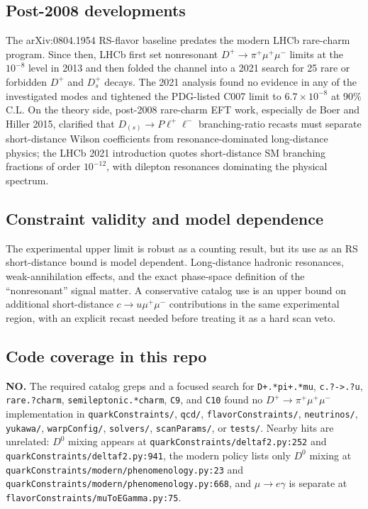 \subsection*{Post-2008 developments}
The arXiv:0804.1954 RS-flavor baseline predates the modern LHCb rare-charm
program.  Since then, LHCb first set nonresonant \(D^+\to\pi^+\mu^+\mu^-\)
limits at the \(10^{-8}\) level in 2013 and then folded the channel into a
2021 search for 25 rare or forbidden \(D^+\) and \(D_s^+\) decays.  The 2021
analysis found no evidence in any of the investigated modes and tightened the
PDG-listed C007 limit to \(6.7\times10^{-8}\) at 90\% C.L.  On the theory side,
post-2008 rare-charm EFT work, especially de Boer and Hiller 2015, clarified
that \(D_{(s)}\to P\ell^+\ell^-\) branching-ratio recasts must separate
short-distance Wilson coefficients from resonance-dominated long-distance
physics; the LHCb 2021 introduction quotes short-distance SM branching
fractions of order \(10^{-12}\), with dilepton resonances dominating the
physical spectrum.

\subsection*{Constraint validity and model dependence}
The experimental upper limit is robust as a counting result, but its use as an
RS short-distance bound is model dependent.  Long-distance hadronic resonances,
weak-annihilation effects, and the exact phase-space definition of the
``nonresonant'' signal matter.  A conservative catalog use is an upper bound on
additional short-distance \(c\to u\mu^+\mu^-\) contributions in the same
experimental region, with an explicit recast needed before treating it as a
hard scan veto.

\subsection*{Code coverage in this repo}
\textbf{NO.}  The required catalog greps and a focused search for
\texttt{D+.*pi+.*mu}, \texttt{c.?->.?u}, \texttt{rare.?charm},
\texttt{semileptonic.*charm}, \texttt{C9}, and \texttt{C10} found no
\(D^+\to\pi^+\mu^+\mu^-\) implementation in \texttt{quarkConstraints/},
\texttt{qcd/}, \texttt{flavorConstraints/}, \texttt{neutrinos/},
\texttt{yukawa/}, \texttt{warpConfig/}, \texttt{solvers/},
\texttt{scanParams/}, or \texttt{tests/}.  Nearby hits are unrelated:
\(D^0\) mixing appears at \texttt{quarkConstraints/deltaf2.py:252} and
\texttt{quarkConstraints/deltaf2.py:941}, the modern policy lists only
\(D^0\) mixing at \texttt{quarkConstraints/modern/phenomenology.py:23} and
\texttt{quarkConstraints/modern/phenomenology.py:668}, and
\(\mu\to e\gamma\) is separate at
\texttt{flavorConstraints/muToEGamma.py:75}.

